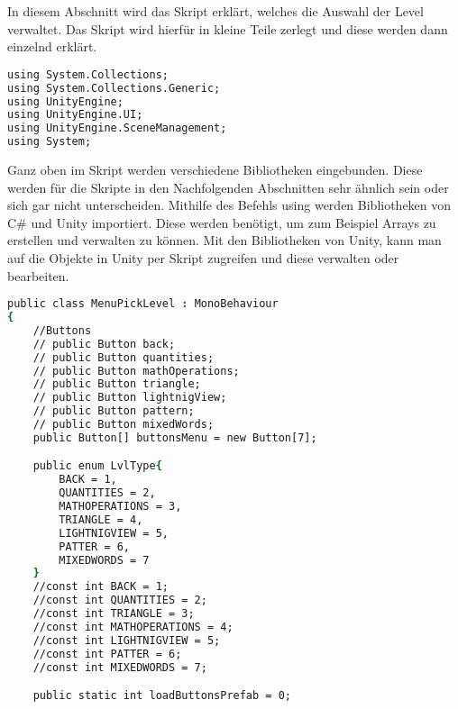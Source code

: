 In diesem Abschnitt wird das Skript erklärt, welches die Auswahl der Level verwaltet.
Das Skript wird hierfür in kleine Teile zerlegt und diese werden dann einzelnd erklärt.\\

\begin{lstlisting}[language=csh, caption={MenuPickLevel.cs Klasse Menü Imports}]
using System.Collections;
using System.Collections.Generic;
using UnityEngine;
using UnityEngine.UI;
using UnityEngine.SceneManagement;
using System;
\end{lstlisting}

Ganz oben im Skript werden verschiedene Bibliotheken eingebunden. Diese werden für die Skripte in den Nachfolgenden Abschnitten sehr ähnlich sein oder sich gar nicht unterscheiden. Mithilfe des Befehls using werden Bibliotheken von C# und Unity importiert. Diese werden benötigt, um zum Beispiel Arrays zu erstellen und verwalten zu können. Mit den Bibliotheken von Unity, kann man auf die Objekte in Unity per Skript zugreifen und diese verwalten oder bearbeiten.\\

\begin{lstlisting}[language=csh, caption={MenuPickLevel.cs Klasse Menü Variablen}]
public class MenuPickLevel : MonoBehaviour
{
	//Buttons
	// public Button back;
	// public Button quantities;
	// public Button mathOperations;
	// public Button triangle;
	// public Button lightnigView;
	// public Button pattern;
	// public Button mixedWords;
	public Button[] buttonsMenu = new Button[7];

	public enum LvlType{
		BACK = 1,
		QUANTITIES = 2,
		MATHOPERATIONS = 3,
		TRIANGLE = 4,
		LIGHTNIGVIEW = 5,
		PATTER = 6,
		MIXEDWORDS = 7
	}
	//const int BACK = 1;
	//const int QUANTITIES = 2;
	//const int TRIANGLE = 3;
	//const int MATHOPERATIONS = 4;
	//const int LIGHTNIGVIEW = 5;
	//const int PATTER = 6;
	//const int MIXEDWORDS = 7;

	public static int loadButtonsPrefab = 0;
\end{lstlisting}

